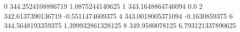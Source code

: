 0 344.2524108886719 1.0875244140625
1 343.1648864746094 0.0
2 342.6137390136719 -0.5511474609375
4 343.0018005371094 -0.1630859375
6 344.5648193359375 1.399932861328125
8 349.9580078125 6.793121337890625
